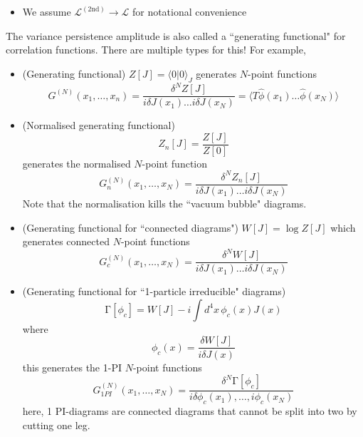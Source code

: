 \begin{rmk}
\begin{itemize}
\item[(iv)] We assume $\mathcal{L}^{(2\mathrm{nd})}\rightarrow \mathcal{L}$ for notational convenience
\end{itemize}
The variance persistence amplitude is also called a ``generating functional" for correlation functions. There are multiple types for this! For example,
\begin{itemize}
\item[(i)] (Generating functional) $Z[J]=\langle 0|0\rangle _{J}$ generates $N$-point functions
\[G^{(N)}(x_1,\ldots ,x_{n})=\dfrac{\delta ^{N}Z[J]}{i\delta J(x_1)\ldots i\delta J(x_{N})}=\langle T\hat{\phi }(x_1)\ldots \hat{\phi }(x_{N})\rangle \]
\item[(ii)] (Normalised generating functional) 
\[Z_{n}[J]=\dfrac{Z[J]}{Z[0]}\]
generates the normalised $N$-point function
\[G^{(N)}_{n}(x_1,\ldots ,x_{N})=\dfrac{\delta ^{N}Z_{n}[J]}{i\delta J(x_1)\ldots i\delta J(x_{N})}\]
Note that the normalisation kills the ``vacuum bubble" diagrams.
\item[(iii)] (Generating functional for ``connected diagrams") $W[J]=\log Z[J]$ which generates connected $N$-point functions
\[G^{(N)}_{c}(x_1,\ldots ,x_{N})=\dfrac{\delta ^{N}W[J]}{i\delta J(x_1)\ldots i\delta J(x_{N})}\]
\item[(iv)] (Generating functional for ``1-particle irreducible" diagrams) 
\[\mathrm{\Gamma} [\phi _{c}]=W[J]-i\int d^{4}x\,\phi _{c}(x)J(x)\]
where
\[\phi _{c}(x)=\dfrac{\delta W[J]}{i\delta J(x)}\]
this generates the 1-PI $N$-point functions 
\[G^{(N)}_{1PI}(x_1,\ldots ,x_{N})=\dfrac{\delta ^{N}\mathrm{\Gamma} [\phi _{c}]}{i\delta \phi _{c}(x_1),\ldots ,i\phi _{c}(x_{N})}\]
here, 1 PI-diagrams are connected diagrams that cannot be split into two by cutting one leg.
\end{itemize}
\end{rmk}
\vspace{2ex}
